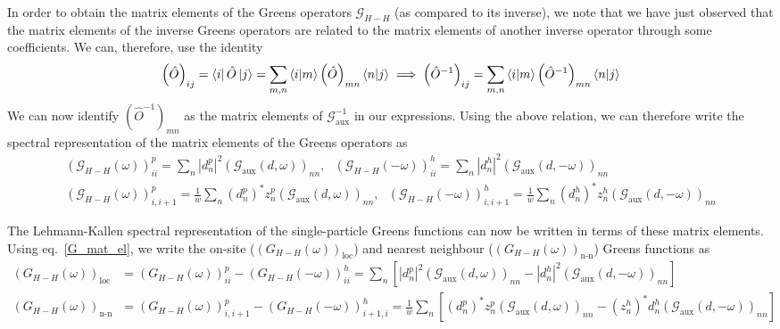 \documentclass{report}
\numberwithin{equation}{section}
\begin{document}
In order to obtain the matrix elements of the Greens operators \(\mathcal{G}_{H-H}\) (as compared to its inverse), we note that we have just observed that the matrix elements of the inverse Greens operators are related to the matrix elements of another inverse operator through some coefficients. We can, therefore, use the identity
\begin{equation}\begin{aligned}
\left(\hat O\right)_{ij} = \bra{i} \hat O \ket{j} = \sum_{m,n} \braket{i|m} \left(\hat O\right)_{mn} \braket{n|j} \implies \left(\hat O^{-1}\right)_{ij} = \sum_{m,n} \braket{i|m} \left(\hat O^{-1}\right)_{mn} \braket{n|j}
\end{aligned}\end{equation}
We can now identify \(\left(\hat O^{-1}\right)_{mn}\) as the matrix elements of \(\mathcal{G}_\text{aux}^{-1}\) in our expressions. Using the above relation, we can therefore write the spectral representation of the matrix elements of the Greens operators as 
\begin{gather}
	\left(\mathcal{G}_{H-H}(\omega)\right)^p_{ii} = \sum_{n} |d^p_n|^2 \left(\mathcal{G}_\text{aux}(d, \omega)\right)_{nn}, ~ ~ ~ \left(\mathcal{G}_{H-H}(-\omega)\right)^h_{ii} = \sum_{n} |d^h_n|^2 \left(\mathcal{G}_\text{aux}(d, -\omega)\right)_{nn}\\
	\left(\mathcal{G}_{H-H}\left(\omega\right) \right)^p_{i,i+1} = \frac{1}{w} \sum_n \left(d^p_n\right)^* z^p_n \left(\mathcal{G}_\text{aux}(d, \omega) \right)_{nn}, ~ ~ ~ \left(\mathcal{G}_{H-H}\left(-\omega\right) \right)^h_{i,i+1} = \frac{1}{w} \sum_n \left(d^h_n\right)^* z^h_n \left(\mathcal{G}_\text{aux}(d, -\omega) \right)_{nn}
\end{gather}

The Lehmann-Kallen spectral representation of the single-particle Greens functions can now be written in terms of these matrix elements. Using eq.~\ref{G_mat_el}, we write the on-site ($\left(G_{H-H}(\omega)\right)_\text{loc}$) and nearest neighbour ($\left(G_{H-H}(\omega)\right)_\text{n-n}$) Greens functions as
\begin{equation}\begin{aligned}
	\label{greens_func_siam}
	\left(G_{H-H}(\omega)\right)_\text{loc} &= \left(G_{H-H}(\omega)\right)_{ii}^p - \left(G_{H-H}(-\omega)\right)_{ii}^h = \sum_n \left[|d^p_n|^2 \left(\mathcal{G}_\text{aux}(d, \omega)\right)_{nn} - |d^h_n|^2 \left(\mathcal{G}_\text{aux}(d, -\omega)\right)_{nn}\right] \\
	\left(G_{H-H}(\omega)\right)_\text{n-n} &= \left(G_{H-H}(\omega)\right)_{i,i+1}^p - \left(G_{H-H}(-\omega)\right)_{i+1,i}^h = \frac{1}{w}\sum_n \left[\left(d^p_n\right)^* z^p_n \left(\mathcal{G}_\text{aux}(d, \omega) \right)_{nn} - \left(z^h_n\right)^* d^h_n \left(\mathcal{G}_\text{aux}(d, -\omega)\right)_{nn}\right] 
\end{aligned}\end{equation}
\end{document}
